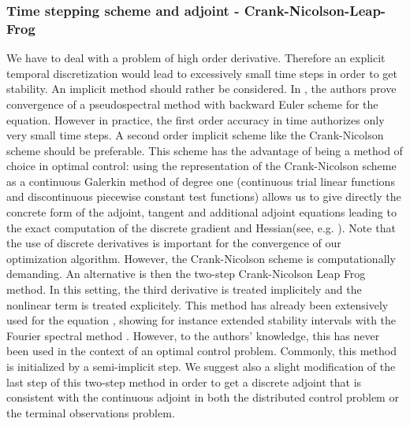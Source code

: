 \subsubsection{Time stepping scheme and adjoint - Crank-Nicolson-Leap-Frog}
\label{numadjoint}
We have to deal with a problem of high order derivative. Therefore an explicit temporal discretization would lead to excessively small time steps in order to get stability. An implicit method should rather be considered. In \cite{li2000error}, the authors prove convergence of a pseudospectral method with backward Euler scheme for the \KdV equation. However in practice, the first order accuracy in time authorizes only very small time steps. A second order implicit scheme like the Crank-Nicolson scheme should be preferable. This scheme has the advantage of being a method of choice in optimal control: using the representation of the Crank-Nicolson scheme as a continuous Galerkin method of degree one (continuous trial linear functions and discontinuous piecewise constant test functions) allows us to give directly the concrete form of the adjoint, tangent and additional adjoint equations leading to the exact computation of the discrete gradient and Hessian(see, e.g. \cite{meidner2007adaptive}). Note that the use of discrete derivatives is important for the convergence of our optimization algorithm. However, the Crank-Nicolson scheme is computationally demanding. An alternative is then the two-step Crank-Nicolson Leap Frog method. In this setting, the third derivative is treated implicitely and the nonlinear term is treated explicitely. This method has already been extensively used for the \KdV equation \cite{shen2003new,ma2000legendre,ma2001optimal}, showing for instance extended stability intervals with the Fourier spectral method \cite{chan1985fourier}. However, to the authors' knowledge, this has never been used in the context of an optimal control problem. Commonly, this method is initialized by a semi-implicit step. We suggest also a slight modification of the last step of this two-step method in order to get a discrete adjoint that is consistent with the continuous adjoint in both the distributed control problem or the terminal observations problem.


